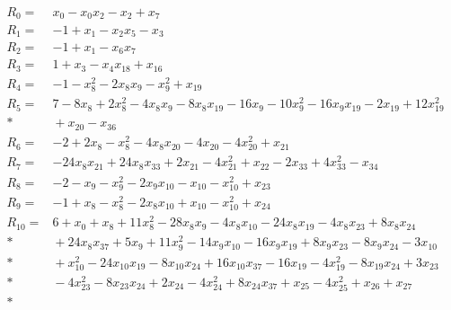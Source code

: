 \documentclass[11pt]{article}
\theoremstyle{remark}\newtheorem{remark}[theorem]{Remark}
\begin{document}
\begingroup
\fontsize{10}{12}\selectfont
\allowdisplaybreaks[4]
\setlength{\jot}{2pt}
\begin{align*}
R_{0} ={}& x_{0} - x_{0}x_{2} - x_{2} + x_{7} \\[4pt]
R_{1} ={}& -1 + x_{1} - x_{2}x_{5} - x_{3} \\[4pt]
R_{2} ={}& -1 + x_{1} - x_{6}x_{7} \\[4pt]
R_{3} ={}& 1 + x_{3} - x_{4}x_{18} + x_{16} \\[4pt]
R_{4} ={}& -1 - x_{8}^{2} - 2x_{8}x_{9} - x_{9}^{2} + x_{19} \\[4pt]
R_{5} ={}& 7 - 8x_{8} + 2x_{8}^{2} - 4x_{8}x_{9} - 8x_{8}x_{19} - 16x_{9} - 10x_{9}^{2} - 16x_{9}x_{19} - 2x_{19} + 12x_{19}^{2} \\*
&{} + x_{20} - x_{36} \\[4pt]
R_{6} ={}& -2 + 2x_{8} - x_{8}^{2} - 4x_{8}x_{20} - 4x_{20} - 4x_{20}^{2} + x_{21} \\[4pt]
R_{7} ={}& -24x_{8}x_{21} + 24x_{8}x_{33} + 2x_{21} - 4x_{21}^{2} + x_{22} - 2x_{33} + 4x_{33}^{2} - x_{34} \\[4pt]
R_{8} ={}& -2 - x_{9} - x_{9}^{2} - 2x_{9}x_{10} - x_{10} - x_{10}^{2} + x_{23} \\[4pt]
R_{9} ={}& -1 + x_{8} - x_{8}^{2} - 2x_{8}x_{10} + x_{10} - x_{10}^{2} + x_{24} \\[4pt]
R_{10} ={}& 6 + x_{0} + x_{8} + 11x_{8}^{2} - 28x_{8}x_{9} - 4x_{8}x_{10} - 24x_{8}x_{19} - 4x_{8}x_{23} + 8x_{8}x_{24} \\*
&{} + 24x_{8}x_{37} + 5x_{9} + 11x_{9}^{2} - 14x_{9}x_{10} - 16x_{9}x_{19} + 8x_{9}x_{23} - 8x_{9}x_{24} - 3x_{10} \\*
&{} + x_{10}^{2} - 24x_{10}x_{19} - 8x_{10}x_{24} + 16x_{10}x_{37} - 16x_{19} - 4x_{19}^{2} - 8x_{19}x_{24} + 3x_{23} \\*
&{} - 4x_{23}^{2} - 8x_{23}x_{24} + 2x_{24} - 4x_{24}^{2} + 8x_{24}x_{37} + x_{25} - 4x_{25}^{2} + x_{26} + x_{27} \\*

\end{align*}
\end{document}
